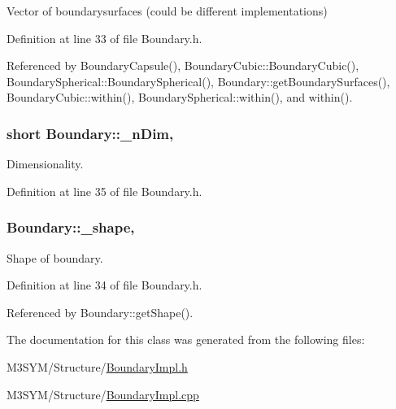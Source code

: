 Vector of boundarysurfaces (could be different implementations) 



Definition at line 33 of file Boundary.\+h.



Referenced by Boundary\+Capsule(), Boundary\+Cubic\+::\+Boundary\+Cubic(), Boundary\+Spherical\+::\+Boundary\+Spherical(), Boundary\+::get\+Boundary\+Surfaces(), Boundary\+Cubic\+::within(), Boundary\+Spherical\+::within(), and within().

\hypertarget{classBoundary_a96f2294e0c822ab216fe5ab7e17258c7}{
\subsubsection[{\+\_\+n\+Dim}]{\setlength{\rightskip}{0pt plus 5cm}short Boundary\+::\+\_\+n\+Dim\hspace{0.3cm}{\ttfamily [protected]}, {\ttfamily [inherited]}}}\label{classBoundary_a96f2294e0c822ab216fe5ab7e17258c7}


Dimensionality. 



Definition at line 35 of file Boundary.\+h.

\hypertarget{classBoundary_a04c10c9a7aea1924d779d392e29f94ff}{
\subsubsection[{\+\_\+shape}]{ Boundary\+::\+\_\+shape\hspace{0.3cm}{\ttfamily [protected]}, {\ttfamily [inherited]}}}\label{classBoundary_a04c10c9a7aea1924d779d392e29f94ff}


Shape of boundary. 



Definition at line 34 of file Boundary.\+h.



Referenced by Boundary\+::get\+Shape().



The documentation for this class was generated from the following files\+:\begin{DoxyCompactItemize}
\item 
M3\+S\+Y\+M/\+Structure/\hyperlink{BoundaryImpl_8h}{Boundary\+Impl.\+h}\item 
M3\+S\+Y\+M/\+Structure/\hyperlink{BoundaryImpl_8cpp}{Boundary\+Impl.\+cpp}\end{DoxyCompactItemize}
